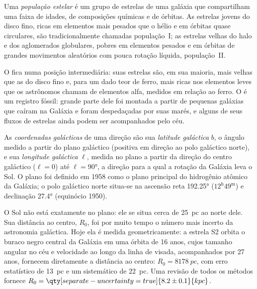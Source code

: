 \begin{definition}\label{def:b3:milky-way-galaxies:populations}
Uma \emph{população estelar} é um grupo de estrelas
de uma galáxia que compartilham uma faixa de idades, de composições químicas e de
órbitas. As estrelas jovens do disco fino, ricas em elementos mais pesados que
o hélio e em órbitas quase circulares, são tradicionalmente chamadas
população~I; as estrelas velhas do halo e dos aglomerados globulares, pobres
em elementos pesados e em órbitas de grandes movimentos aleatórios com pouca
rotação líquida, população~II.
\end{definition}

O  fica numa posição intermediária: suas estrelas são, em sua maioria, mais velhas que as
do disco fino e, para um dado teor de ferro, mais ricas nos elementos leves que os astrônomos
chamam de elementos alfa, medidos em relação ao ferro. O  é
um registro fóssil: grande parte dele foi montada a partir de pequenas galáxias que caíram na
Galáxia e foram despedaçadas por suas marés, e alguns de seus fluxos de estrelas
ainda podem ser acompanhados
pelo céu.

\begin{definition}\label{def:b3:milky-way-galaxies:coordinates}
As \emph{coordenadas galácticas} de uma direção
são sua \emph{latitude galáctica} $b$, o ângulo medido a partir do plano galáctico
(positiva em direção ao polo galáctico norte), e sua \emph{longitude
galáctica} $\ell$, medida no plano a partir da direção do
centro galáctico ($\ell = 0$) até $\ell = \ang{90}$, a direção
para a qual a rotação da Galáxia leva o Sol. O plano foi
definido em 1958 como o plano principal do hidrogênio atômico da Galáxia;
o polo galáctico norte situa-se na ascensão reta \ang{192.25}
($12^\mathrm{h}49^\mathrm{m}$) e declinação \ang{27.4} (equinócio
1950).
\end{definition}

O Sol não está exatamente no plano: ele se situa cerca de \qty{25}{pc} ao norte dele.
Sua distância ao centro, $R_0$, foi por muito tempo o número mais incerto da
astronomia galáctica. Hoje ela é medida geometricamente: a estrela S2 orbita
o buraco negro central da Galáxia em uma órbita de \num{16} anos, cujos
tamanho angular no céu e velocidade ao longo da linha de visada, acompanhados
por 27 anos, fornecem diretamente a distância ao centro:
$R_0 = \qty{8178}{pc}$, com erro estatístico de \qty{13}{pc} e um
sistemático de \qty{22}{pc}. Uma revisão de todos os métodos fornece
$R_0 = \qty[separate-uncertainty=true]{8.2 \pm 0.1}{kpc}$.

